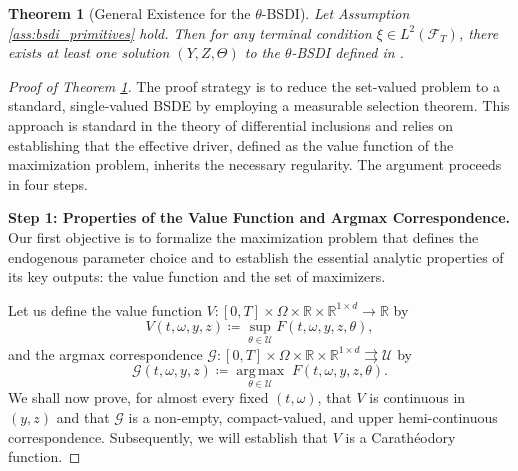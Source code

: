 \documentclass[12pt, letterpaper]{amsart}
\newcommand{\Ucal}{\mathcal{U}}
\newcommand{\R}{\mathbb{R}}
\DeclareMathOperator*{\argmax}{arg\,max}
\theoremstyle{plain}
\newtheorem{theorem}{Theorem}[section]
\theoremstyle{definition}
\theoremstyle{remark}
\numberwithin{equation}{section} %
\begin{document}
\begin{theorem}[General Existence for the $\theta$-BSDI]
\label{thm:bsdi_existence}
Let Assumption \ref{ass:bsdi_primitives} hold. Then for any terminal condition $\xi \in L^2(\mathcal{F}_T)$, there exists at least one solution $(Y,Z,\Theta)$ to the $\theta$-BSDI defined in .
\end{theorem}
\begin{proof}[Proof of Theorem \ref{thm:bsdi_existence}]
The proof strategy is to reduce the set-valued problem to a standard, single-valued BSDE by employing a measurable selection theorem. This approach is standard in the theory of differential inclusions and relies on establishing that the effective driver, defined as the value function of the maximization problem, inherits the necessary regularity. The argument proceeds in four steps.

\vspace{1ex}
\noindent\textbf{Step 1: Properties of the Value Function and Argmax Correspondence.}
Our first objective is to formalize the maximization problem that defines the endogenous parameter choice and to establish the essential analytic properties of its key outputs: the value function and the set of maximizers.

Let us define the value function $V: [0,T] \times \Omega \times \R \times \R^{1\times d} \to \R$ by
\[ V(t,\omega,y,z) \coloneqq \sup_{\theta \in \Ucal} F(t,\omega,y,z,\theta), \]
and the argmax correspondence $\mathcal{G}: [0,T] \times \Omega \times \R \times \R^{1\times d} \rightrightarrows \Ucal$ by
\[ \mathcal{G}(t,\omega,y,z) \coloneqq \underset{\theta \in \Ucal}{\argmax} \; F(t,\omega,y,z,\theta). \]
We shall now prove, for almost every fixed $(t,\omega)$, that $V$ is continuous in $(y,z)$ and that $\mathcal{G}$ is a non-empty, compact-valued, and upper hemi-continuous correspondence. Subsequently, we will establish that $V$ is a Carathéodory function.


\end{proof}
\end{document}
